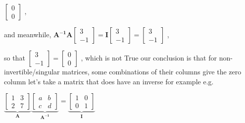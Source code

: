 \documentclass[12pt, a4paper]{article}
\begin{document}
{\begin{math}
\begin{bmatrix}
		0 \\
		0
	\end{bmatrix}
\end{math}
, 
\par 
and meanwhile, 
\begin{math}
	{\mathbf{A^{-1}}}{\mathbf{A}}
	\begin{bmatrix}
		3 \\
		-1
	\end{bmatrix}
	= 
	{\mathbf{I}}
	\begin{bmatrix}
		3 \\
		-1
	\end{bmatrix}
	 = 
	\begin{bmatrix}
		3 \\
		-1
	\end{bmatrix}
\end{math}
, 
\par
so that 
\begin{math}
	\begin{bmatrix}
		3 \\
		-1
	\end{bmatrix}
	 = 
	\begin{bmatrix}
		0 \\
		0
	\end{bmatrix}
\end{math}
, which is not True
\vspace{14pt}
\newline
{\textcolor{anhao-scarlet}{our conclusion is that for non-invertible/singular matrices, some combinations of their columns give the zero column}}
\vspace{14pt}
\newline
let's take a matrix that does have an inverse for example
\newline
e.g.
\par 
\begin{math}
	{
		\underbrace{
			\begin{bmatrix}
				1 & 3 \\
				2 & 7
			\end{bmatrix}
		}_{\mathbf{A}}
	}
	{
		\underbrace{
			\begin{bmatrix}
				a & b \\
				c & d
			\end{bmatrix}
		}_{\mathbf{A^{-1}}}
	}
	 = 
	{
		\underbrace{
			\begin{bmatrix}
				1 & 0 \\
				0 & 1
			\end{bmatrix}
		}_{\mathbf{I}}
}
\end{math}}
\end{document}
